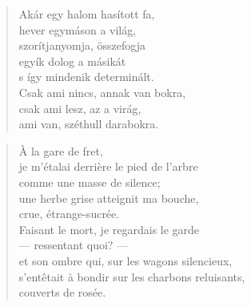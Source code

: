 \bigskip


\begin{verse}
  Akár egy halom hasított fa, \\
  hever egymáson a világ, \\
  szorítjanyomja, összefogja \\
  egyík dolog a másikát \\
  s így mindenik determinált. \\
  Csak ami nincs, annak van bokra, \\
  csak ami lesz, az a virág, \\
  ami van, széthull darabokra.
\end{verse}

\newpage


\vspace*{-15mm}
\centeredornament




\begin{verse}
  À la gare de fret, \\
  je m'étalai derrière le pied de l'arbre \\
  comme une masse de silence; \\
  une herbe grise atteignit ma bouche, \\
  crue, étrange-sucrée. \\
  Faisant le mort, je regardais le garde \\
  --- ressentant quoi? --- \\
  et son ombre qui, sur les wagons silencieux, \\
  s'entêtait à bondir sur les charbons reluisants,\hspace*{-4mm} \\
  couverts de rosée.
\end{verse}

\bigskip


